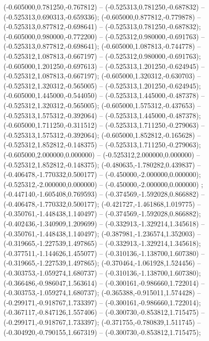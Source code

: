 (-0.605000,0.781250,-0.767812) -- (-0.525313,0.781250,-0.687832) -- (-0.525313,0.690313,-0.659336);
 (-0.605000,0.877812,-0.779878) -- (-0.525313,0.877812,-0.698641) -- (-0.525313,0.781250,-0.687832);
 (-0.605000,0.980000,-0.772200) -- (-0.525312,0.980000,-0.691763) -- (-0.525313,0.877812,-0.698641);
 (-0.605000,1.087813,-0.744778) -- (-0.525312,1.087813,-0.667197) -- (-0.525312,0.980000,-0.691763);
 (-0.605000,1.201250,-0.697613) -- (-0.525313,1.201250,-0.624945) -- (-0.525312,1.087813,-0.667197);
 (-0.605000,1.320312,-0.630703) -- (-0.525312,1.320312,-0.565005) -- (-0.525313,1.201250,-0.624945);
 (-0.605000,1.445000,-0.544050) -- (-0.525313,1.445000,-0.487378) -- (-0.525312,1.320312,-0.565005);
 (-0.605000,1.575312,-0.437653) -- (-0.525313,1.575312,-0.392064) -- (-0.525313,1.445000,-0.487378);
 (-0.605000,1.711250,-0.311512) -- (-0.525313,1.711250,-0.279063) -- (-0.525313,1.575312,-0.392064);
 (-0.605000,1.852812,-0.165628) -- (-0.525312,1.852812,-0.148375) -- (-0.525313,1.711250,-0.279063);
 (-0.605000,2.000000,0.000000) -- (-0.525312,2.000000,0.000000) -- (-0.525312,1.852812,-0.148375);
 (-0.480635,-1.780282,0.439837) -- (-0.406478,-1.770332,0.500177) -- (-0.450000,-2.000000,0.000000);
 (-0.525312,-2.000000,0.000000) -- (-0.450000,-2.000000,0.000000) ;
 (-0.447140,-1.605408,0.769593) -- (-0.374569,-1.592028,0.866882) -- (-0.406478,-1.770332,0.500177);
 (-0.421727,-1.461868,1.019775) -- (-0.350761,-1.448438,1.140497) -- (-0.374569,-1.592028,0.866882);
 (-0.402436,-1.340909,1.209699) -- (-0.332913,-1.329214,1.345618) -- (-0.350761,-1.448438,1.140497);
 (-0.387981,-1.236574,1.352003) -- (-0.319665,-1.227539,1.497865) -- (-0.332913,-1.329214,1.345618);
 (-0.377511,-1.144626,1.455077) -- (-0.310136,-1.138700,1.607380) -- (-0.319665,-1.227539,1.497865);
 (-0.370464,-1.061928,1.524456) -- (-0.303753,-1.059274,1.680737) -- (-0.310136,-1.138700,1.607380);
 (-0.366486,-0.986047,1.563614) -- (-0.300161,-0.986660,1.722014) -- (-0.303753,-1.059274,1.680737);
 (-0.365388,-0.915011,1.574428) -- (-0.299171,-0.918767,1.733397) -- (-0.300161,-0.986660,1.722014);
 (-0.367117,-0.847126,1.557406) -- (-0.300730,-0.853812,1.715475) -- (-0.299171,-0.918767,1.733397);
 (-0.371755,-0.780839,1.511745) -- (-0.304920,-0.790155,1.667319) -- (-0.300730,-0.853812,1.715475);
